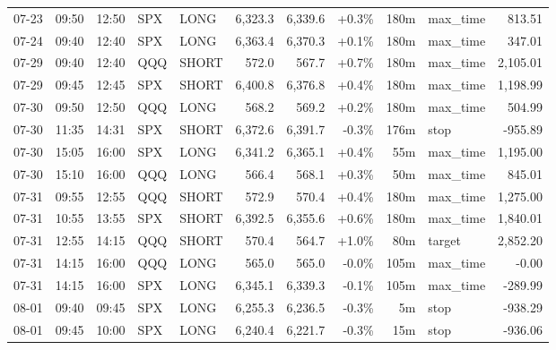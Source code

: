 \documentclass[11pt,a4paper,twoside]{article}
\begin{document}
\begin{center}
\begin{longtable}{>{\color{txtmain}}l l l l l r r r r >{\color{txtmain}}l r}
07-23 & 09:50 & 12:50 & SPX & LONG & 6,323.3 & 6,339.6 & \textcolor{wingreen}{+0.3\%} & 180m & max\_time & \textcolor{wingreen}{813.51} \\
07-24 & 09:40 & 12:40 & SPX & LONG & 6,363.4 & 6,370.3 & \textcolor{wingreen}{+0.1\%} & 180m & max\_time & \textcolor{wingreen}{347.01} \\
07-29 & 09:40 & 12:40 & QQQ & SHORT & 572.0 & 567.7 & \textcolor{wingreen}{+0.7\%} & 180m & max\_time & \textcolor{wingreen}{2,105.01} \\
07-29 & 09:45 & 12:45 & SPX & SHORT & 6,400.8 & 6,376.8 & \textcolor{wingreen}{+0.4\%} & 180m & max\_time & \textcolor{wingreen}{1,198.99} \\
07-30 & 09:50 & 12:50 & QQQ & LONG & 568.2 & 569.2 & \textcolor{wingreen}{+0.2\%} & 180m & max\_time & \textcolor{wingreen}{504.99} \\
07-30 & 11:35 & 14:31 & SPX & SHORT & 6,372.6 & 6,391.7 & \textcolor{lossred}{-0.3\%} & 176m & stop & \textcolor{lossred}{-955.89} \\
07-30 & 15:05 & 16:00 & SPX & LONG & 6,341.2 & 6,365.1 & \textcolor{wingreen}{+0.4\%} & 55m & max\_time & \textcolor{wingreen}{1,195.00} \\
07-30 & 15:10 & 16:00 & QQQ & LONG & 566.4 & 568.1 & \textcolor{wingreen}{+0.3\%} & 50m & max\_time & \textcolor{wingreen}{845.01} \\
07-31 & 09:55 & 12:55 & QQQ & SHORT & 572.9 & 570.4 & \textcolor{wingreen}{+0.4\%} & 180m & max\_time & \textcolor{wingreen}{1,275.00} \\
07-31 & 10:55 & 13:55 & SPX & SHORT & 6,392.5 & 6,355.6 & \textcolor{wingreen}{+0.6\%} & 180m & max\_time & \textcolor{wingreen}{1,840.01} \\
07-31 & 12:55 & 14:15 & QQQ & SHORT & 570.4 & 564.7 & \textcolor{wingreen}{+1.0\%} & 80m & target & \textcolor{wingreen}{2,852.20} \\
07-31 & 14:15 & 16:00 & QQQ & LONG & 565.0 & 565.0 & \textcolor{lossred}{-0.0\%} & 105m & max\_time & \textcolor{lossred}{-0.00} \\
07-31 & 14:15 & 16:00 & SPX & LONG & 6,345.1 & 6,339.3 & \textcolor{lossred}{-0.1\%} & 105m & max\_time & \textcolor{lossred}{-289.99} \\
08-01 & 09:40 & 09:45 & SPX & LONG & 6,255.3 & 6,236.5 & \textcolor{lossred}{-0.3\%} & 5m & stop & \textcolor{lossred}{-938.29} \\
08-01 & 09:45 & 10:00 & SPX & LONG & 6,240.4 & 6,221.7 & \textcolor{lossred}{-0.3\%} & 15m & stop & \textcolor{lossred}{-936.06} \\

\end{longtable}
\end{center}
\end{document}
